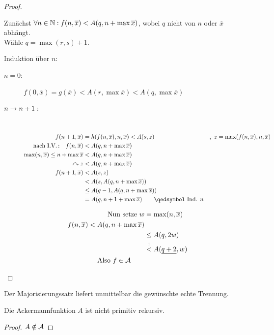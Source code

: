 \begin{proof}
\begin{enumerate}
		Zunächst $\forall n\in\mathbb{N}: f(n,\overline{x}) < A(q,n+\max\overline x)$, wobei $q$ nicht von $n$ oder $\overline{x}$ abhängt.\\
		Wähle $q=\max(r,s)+1$.
		
		Induktion über $n$:
		\begin{description}
		\item[$n=0:$]\qquad $f(0,\overline{x}) = g(\overline{x}) < A(r,\max\overline{x}) < A(q,\max \overline{x})$
		\item[$n\->n+1:$]\ \vspace{-2em}
			\begin{align*}
				f(n+1,\overline{x}) &= h(f(n,\overline{x}),n,\overline{x}) < A(s,z) &&,\ z=\max(f(n,\overline{x}),n,\overline{x})\\
				\text{nach I.V.\,:}\quad f(n,\overline{x}) &< A(q,n+\max\overline{x})\\
				\max(n,\overline{x}) \leq n+\max\overline{x} &< A(q,n+\max\overline{x})\\
				\curvearrowright z &< A(q,n+\max\overline{x})\\
				f(n+1,\overline{x}) &< A(s,z)\\
				&< A(s,A(q,n+\max\overline{x}))\\
				&\leq A(q-1,A(q,n+\max\overline{x}))\\
				&= A(q,n+1+\max\overline{x}) \tag*{\qedsymbol\ Ind. $n$}
			\end{align*}
		\end{description}
		\begin{align*}
			\text{Nun setze }w &=\max(n,\overline{x})\\
			f(n,\overline{x}) < A(q,n+\max\overline{x})\\
			&\leq A(q,2w)\\
			&\overset!< A(\underline{q+2},w)\\
			\text{Also }f\in\mathcal{A} \tag*{\qedhere}
		\end{align*}
	\end{enumerate}
\end{proof}
Der Majorisierungssatz liefert unmittelbar die gewünschte echte Trennung.
\begin{Korollar}
	Die Ackermannfunktion $A$ ist nicht primitiv rekursiv.
\end{Korollar}
\begin{proof}
  $A\notin\mathcal{A}$
\end{proof}


